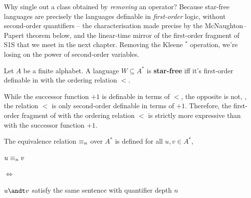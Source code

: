 \documentclass[oneside]{academica}
\begin{document}
Why single out a class obtained by \emph{removing} an operator? Because star-free languages are precisely the languages definable in \emph{first-order} logic, without second-order quantifiers -- the characterisation made precise by the McNaughton--Papert theorem below, and the linear-time mirror of the first-order fragment of S1S that we meet in the next chapter. Removing the Kleene $^*$ operation, we're losing on the power of second-order variables.

\begin{theorem}\label{thm:mcnaughton_papert}
  Let $A$ be a finite alphabet.
  A language $W \subseteq A^*$ is \textbf{star-free} iff it's first-order definable in \SA with the ordering relation $<$.
\end{theorem}

While the successor function $+1$ is definable in terms of $<$, the opposite is not, \ie, the relation $<$ is only second-order definable in terms of $+1$.
Therefore, the first-order fragment of \SA with the ordering relation $<$ is strictly more expressive than with the successor function $+1$.

\begin{definition*}[$n$-equivalence]
  The equivalence relation $\equiv_{n}$ over $A^*$ is defined for all $u,v \in A^*$, \st

  \bigskip
  \begin{minipage}{0.25\textwidth}
    \hfill
  \end{minipage}
  \begin{minipage}{0.1\textwidth}
    $u \equiv_{n} v$
  \end{minipage}
  \begin{minipage}{0.1\textwidth}
    $\iff$
  \end{minipage}
  \begin{minipage}{0.4\textwidth}
    \begin{center}
      $u \andt v$ satisfy the same sentence with quantifier depth $n$
    \end{center}
  \end{minipage}
  \hfill
\end{definition*}
\end{document}
